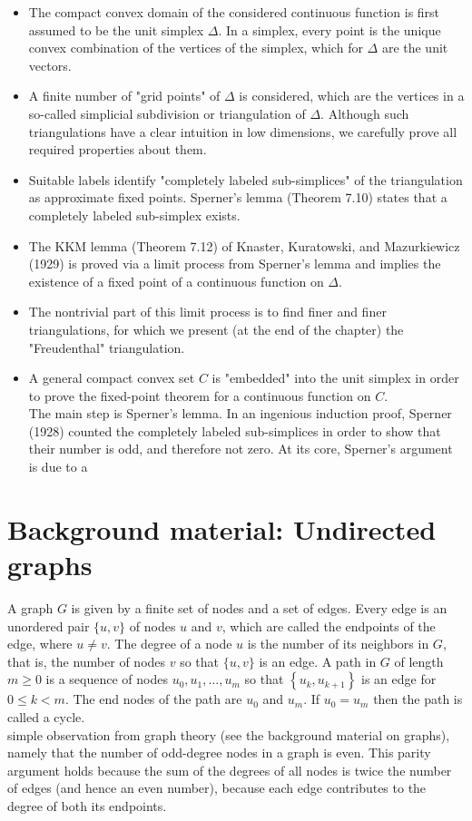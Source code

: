 \documentclass[12pt]{article}
\begin{document}
\begin{itemize}
  \item The compact convex domain of the considered continuous function is first assumed to be the unit simplex $\Delta$. In a simplex, every point is the unique convex combination of the vertices of the simplex, which for $\Delta$ are the unit vectors.
  \item A finite number of "grid points" of $\Delta$ is considered, which are the vertices in a so-called simplicial subdivision or triangulation of $\Delta$. Although such triangulations have a clear intuition in low dimensions, we carefully prove all required properties about them.
  \item Suitable labels identify "completely labeled sub-simplices" of the triangulation as approximate fixed points. Sperner's lemma (Theorem 7.10) states that a completely labeled sub-simplex exists.
  \item The KKM lemma (Theorem 7.12) of Knaster, Kuratowski, and Mazurkiewicz (1929) is proved via a limit process from Sperner's lemma and implies the existence of a fixed point of a continuous function on $\Delta$.
  \item The nontrivial part of this limit process is to find finer and finer triangulations, for which we present (at the end of the chapter) the "Freudenthal" triangulation.
  \item A general compact convex set $C$ is "embedded" into the unit simplex in order to prove the fixed-point theorem for a continuous function on $C$.\\
The main step is Sperner's lemma. In an ingenious induction proof, Sperner (1928) counted the completely labeled sub-simplices in order to show that their number is odd, and therefore not zero. At its core, Sperner's argument is due to a
\end{itemize}

\section*{Background material: Undirected graphs}
A graph $G$ is given by a finite set of nodes and a set of edges. Every edge is an unordered pair $\{u, v\}$ of nodes $u$ and $v$, which are called the endpoints of the edge, where $u \neq v$. The degree of a node $u$ is the number of its neighbors in $G$, that is, the number of nodes $v$ so that $\{u, v\}$ is an edge. A path in $G$ of length $m \geq 0$ is a sequence of nodes $u_{0}, u_{1}, \ldots, u_{m}$ so that $\left\{u_{k}, u_{k+1}\right\}$ is an edge for $0 \leq k<m$. The end nodes of the path are $u_{0}$ and $u_{m}$. If $u_{0}=u_{m}$ then the path is called a cycle.\\
simple observation from graph theory (see the background material on graphs), namely that the number of odd-degree nodes in a graph is even. This parity argument holds because the sum of the degrees of all nodes is twice the number of edges (and hence an even number), because each edge contributes to the degree of both its endpoints.
\end{document}

